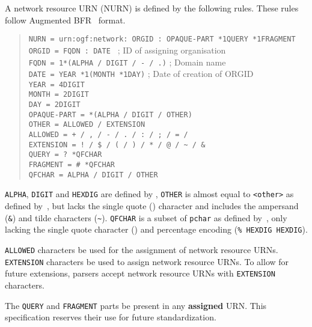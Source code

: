 \documentclass[12pt]{article}  %
\begin{document}
A network resource URN (NURN) is defined by the following rules. These rules follow Augmented BFR~\cite{rfc5234} format.
\begin{quote}
  \texttt{NURN = \qq{}urn:ogf:network:\qq{} ORGID \qq{}:\qq{} OPAQUE-PART *1QUERY *1FRAGMENT} \\
  \texttt{ORGID = FQDN \qq{}:\qq{} DATE } ; ID of assigning organisation  \\
  \texttt{FQDN = 1*(ALPHA / DIGIT / \qq{}-\qq{} / \qq{}.\qq{})} ; Domain name \\
  \texttt{DATE = YEAR *1(MONTH *1DAY)} ; Date of creation of ORGID \\
  \texttt{YEAR = 4DIGIT} \\
  \texttt{MONTH = 2DIGIT} \\
  \texttt{DAY = 2DIGIT} \\
  \texttt{OPAQUE-PART = *(ALPHA / DIGIT / OTHER)} \\
  \texttt{OTHER = ALLOWED / EXTENSION} \\
  \texttt{ALLOWED = \qq{}+\qq{} / \qq{},\qq{} / \qq{}-\qq{} / \qq{}.\qq{} / \qq{}:\qq{} / \qq{};\qq{} / \qq{}=\qq{} / \qq{}\underscore\qq{}} \\
  \texttt{EXTENSION = \qq{}!\qq{} / \qq{}\$\qq{} / \qq{}(\qq{} / \qq{})\qq{} / \qq{}*\qq{} / \qq{}@\qq{} / \qq{}\textasciitilde\qq{} / \qq{}\&\qq{}} \\
  \texttt{QUERY = \qq{}?\qq{} *QFCHAR} \\
  \texttt{FRAGMENT = \qq{}\#\qq{} *QFCHAR} \\
  \texttt{QFCHAR = ALPHA / DIGIT / OTHER}
\end{quote}

\texttt{ALPHA}, \texttt{DIGIT} and \texttt{HEXDIG} are defined by \cite{rfc5234}, \texttt{OTHER} is almost equal to \texttt{<other>} as defined by~\cite{rfc2141}, but lacks the single quote (\texttt{\q{}}) character and includes the ampersand (\texttt{\&}) and tilde characters (\texttt{\textasciitilde}). \texttt{QFCHAR} is a subset of \texttt{pchar} as defined by~\cite{rfc3986}, only lacking the single quote character (\texttt{\q{}}) and percentage encoding (\texttt{\qq\%\qq{} HEXDIG HEXDIG}).

\texttt{ALLOWED} characters \MAY{} be used for the assignment of network resource URNs. 
\texttt{EXTENSION} characters \SHOULDNOT{} be used to assign network resource URNs. 
To allow for future extensions, parsers \SHOULD{} accept network resource URNs with \texttt{EXTENSION} characters.

The \texttt{QUERY} and \texttt{FRAGMENT} parts \MUSTNOT{} be present in any \textbf{assigned} URN.  This specification reserves their use for future standardization.
\end{document}
